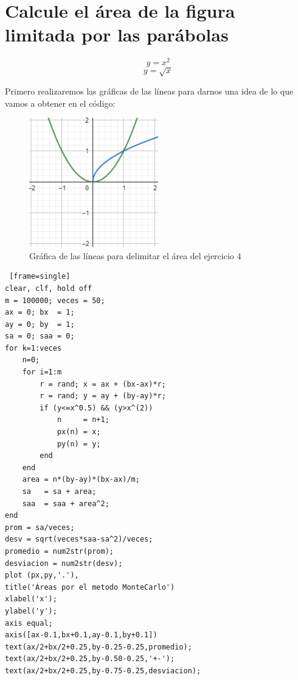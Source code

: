 \documentclass{article}
\begin{document}
\section{Calcule el área de la figura limitada por las parábolas}

\begin{equation}
y=x^2
\end{equation}
\begin{equation}
y=\sqrt{x}
\end{equation}

Primero realizaremos las gráficas de las líneas para darnos una idea de lo que vamos a obtener en el código:

\begin{figure}[H]
\centering
    \includegraphics[width=0.5\textwidth]{images/Capture04.PNG}
    \caption{Gráfica de las líneas para delimitar el área del ejercicio 4}
\end{figure}

\clearpage
\newpage

\begin{lstlisting} [frame=single]
clear, clf, hold off
m = 100000; veces = 50;
ax = 0; bx  = 1;
ay = 0; by  = 1;
sa = 0; saa = 0;
for k=1:veces
    n=0;
    for i=1:m
        r = rand; x = ax + (bx-ax)*r;
        r = rand; y = ay + (by-ay)*r;
        if (y<=x^0.5) && (y>x^(2))
            n     = n+1;
            px(n) = x; 
            py(n) = y;
        end
    end
    area = n*(by-ay)*(bx-ax)/m;
    sa   = sa + area;
    saa  = saa + area^2;
end
prom = sa/veces;
desv = sqrt(veces*saa-sa^2)/veces;
promedio = num2str(prom);
desviacion = num2str(desv);
plot (px,py,'.'),
title('Áreas por el metodo MonteCarlo') 
xlabel('x');
ylabel('y');
axis equal;
axis([ax-0.1,bx+0.1,ay-0.1,by+0.1])
text(ax/2+bx/2+0.25,by-0.25-0.25,promedio);
text(ax/2+bx/2+0.25,by-0.50-0.25,'+-');
text(ax/2+bx/2+0.25,by-0.75-0.25,desviacion);
\end{lstlisting}
\end{document}
